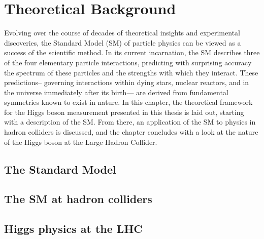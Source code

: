 \chapter{Theoretical Background}
\label{chap:theory}

Evolving over the course of decades of theoretical insights and
experimental discoveries, the Standard Model (SM) of particle physics
can be viewed as a success of the scientific method. In its current
incarnation, the SM describes three of the four elementary particle
interactions, predicting with surprising accuracy the spectrum of
these particles and the strengths with which they interact. These
predictions-- governing interactions within dying stars, nuclear
reactors, and in the universe immediately after its birth--- are
derived from fundamental symmetries known to exist in nature. In this
chapter, the theoretical framework for the Higgs boson measurement
presented in this thesis is laid out, starting with a description of
the SM. From there, an application of the SM to physics in hadron
colliders is discussed, and the chapter
concludes with a look at the nature of the Higgs boson at the Large
Hadron Collider. 

\section{The Standard Model}
\label{chapter:theory:section:sm_intro}


%

\section{The SM at hadron colliders}
\label{chapter:theory:section:collider_physics}


\section{Higgs physics at the LHC}
\label{chapter:theory:section:higgs_physics}


%
